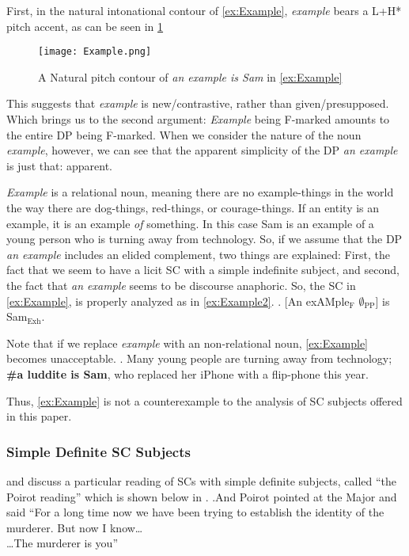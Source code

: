 \documentclass[letterpaper]{article}
\begin{document}
First, in the natural intonational contour of \ref{ex:Example}, \textit{example} bears a L+H* pitch accent, as can be seen in \ref{fig:Example}
\begin{figure}[h]
	\centering
	\texttt{[image: Example.png]}
	\caption{A Natural pitch contour of \textit{an example is Sam} in \ref{ex:Example}}
	\label{fig:Example}
\end{figure}
This suggests that \textit{example} is new/contrastive, rather than given/presupposed.
Which brings us to the second argument: \textit{Example} being F-marked amounts to the entire DP being F-marked.
When we consider the nature of the noun \textit{example}, however, we can see that the apparent simplicity of the DP \textit{an example} is just that: apparent.

\textit{Example} is a relational noun, meaning there are no example-things in the world the way there are dog-things, red-things, or courage-things.
If an entity is an example, it is an example \textit{of} something.
In this case Sam is an example of a young person who is turning away from technology.
So, if we assume that the DP \textit{an example} includes an elided complement, two things are explained:
First, the fact that we seem to have a licit SC with a simple indefinite subject, and second, the fact that \textit{an example} seems to be discourse anaphoric.
So, the SC in \ref{ex:Example}, is properly analyzed as in \ref{ex:Example2}.
\ex. \label{ex:Example2} [An exAMple$_\text{F}$ $\emptyset_\text{PP}$] is Sam$_\text{Exh}$.

Note that if we replace \textit{example} with an non-relational noun, \ref{ex:Example} becomes unacceptable.
\ex. \label{ex:Luddite} Many young people are turning away from technology; \textbf{\#a luddite is Sam}, who replaced her iPhone with a flip-phone this year.

Thus, \ref{ex:Example} is not a counterexample to the analysis of SC subjects offered in this paper.
\subsubsection{Simple Definite SC Subjects}

\textcite{heycock2010variability} and \textcite{bejarkahnemuyipour2013agreement} discuss a particular reading of SCs with simple definite subjects, called ``the Poirot reading'' which is shown below in \Next.
\ex.And Poirot pointed at the Major and said ``For a long time now we have been trying to establish the identity of the murderer. But now I know\ldots\\
\ldots The murderer is you''
\end{document}
